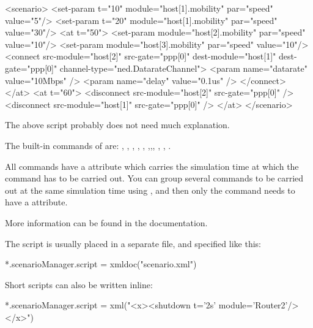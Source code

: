 \begin{XML}
<scenario>
    <set-param t="10" module="host[1].mobility" par="speed" value="5"/>
    <set-param t="20" module="host[1].mobility" par="speed" value="30"/>
    <at t="50">
        <set-param module="host[2].mobility" par="speed" value="10"/>
        <set-param module="host[3].mobility" par="speed" value="10"/>
        <connect src-module="host[2]" src-gate="ppp[0]"
                 dest-module="host[1]" dest-gate="ppp[0]"
                 channel-type="ned.DatarateChannel">
            <param name="datarate" value="10Mbps" />
            <param name="delay" value="0.1us" />
        </connect>
    </at>
    <at t="60">
        <disconnect src-module="host[2]" src-gate="ppp[0]" />
        <disconnect src-module="host[1]" src-gate="ppp[0]" />
    </at>
</scenario>
\end{XML}

The above script probably does not need much explanation.

The built-in commands of  are:
, ,
, ,
, ,,,
, , .

All commands have a  attribute which carries the simulation time
at which the command has to be carried out. You can group several commands
to be carried out at the same simulation time using , and
then only the  command needs to have a  attribute.

More information can be found in the  documentation.

The script is usually placed in a separate file, and specified like this:

\begin{inifile}
*.scenarioManager.script = xmldoc("scenario.xml")
\end{inifile}

Short scripts can also be written inline:

\begin{inifile}
*.scenarioManager.script = xml("<x><shutdown t='2s' module='Router2'/></x>")
\end{inifile}




